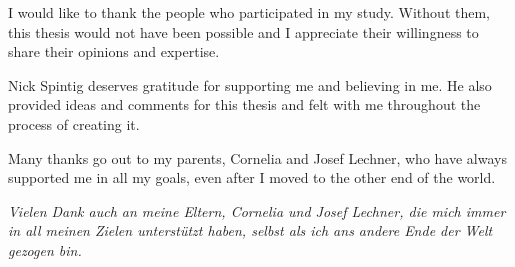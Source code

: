 \documentclass[letterpaper,12pt,oneside,final]{book}
\begin{document}
I would like to thank the people who participated in my study. Without them, this thesis would not have been possible and I appreciate their willingness to share their opinions and expertise.

Nick Spintig deserves gratitude for supporting me and believing in me. He also provided ideas and comments for this thesis and felt with me throughout the process of creating it.

Many thanks go out to my parents, Cornelia and Josef Lechner, who have always supported me in all my goals, even after I moved to the other end of the world.

\textit{Vielen Dank auch an meine Eltern, Cornelia und Josef Lechner, die mich immer in all meinen Zielen unterst\"utzt haben, selbst als ich ans andere Ende der Welt gezogen bin.}

\newpage
\tableofcontents

\newpage
\listoffigures

\newpage
\listoftables

\mainmatter












\begin{singlespace}
	
	
\end{singlespace}

\appendix













\end{document}
